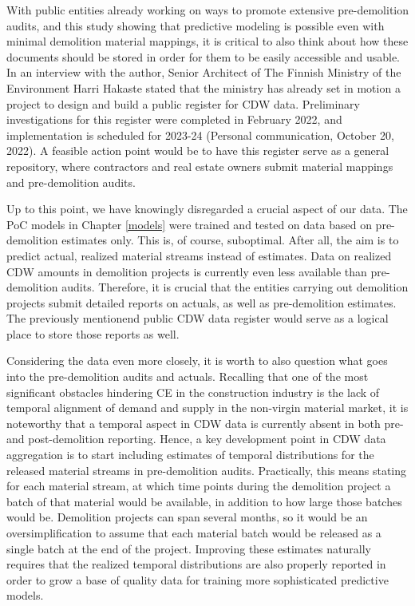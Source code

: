 \documentclass[english, 12pt, a4paper, sci, utf8, a-2b, online]{aaltothesis}
\begin{document}
With public entities already working on ways to promote extensive pre-demolition audits, and this study showing that predictive modeling is possible even with minimal demolition material mappings,
it is critical to also think about how these documents should be stored in order for them to be easily accessible and usable. In an interview with the author, Senior Architect of The Finnish
Ministry of the Environment Harri Hakaste stated that the ministry has already set in motion a
project to design and build a public register for CDW data. Preliminary investigations for this register were completed in February 2022, and implementation is scheduled for 2023-24
(Personal communication, October 20, 2022).
A feasible action point would be to have this register serve as a general repository, where contractors and real estate owners submit material mappings and pre-demolition audits.

Up to this point, we have knowingly disregarded a crucial aspect of our data. The PoC models in Chapter \ref{models} were trained and tested on data based on pre-demolition estimates
only. This is, of course, suboptimal. After all, the aim is to predict actual, realized material streams instead of estimates. Data on realized CDW amounts in demolition projects is currently
even less available than pre-demolition audits. Therefore, it is crucial that the entities carrying out demolition projects submit detailed reports on actuals, as well as pre-demolition estimates.
The previously mentionend public CDW data register would serve as a logical place to store those reports as well.

Considering the data even more closely, it is worth to also question what goes into the pre-demolition audits and actuals. Recalling that one of the most significant obstacles hindering CE in the
construction industry is the lack of temporal alignment of demand and supply in the non-virgin material market, it is noteworthy that a temporal aspect in CDW data is currently absent
in both pre- and post-demolition reporting. Hence, a key development point in CDW data aggregation is to start including estimates of temporal distributions for the released material streams in
pre-demolition audits. Practically, this means stating for each material stream, at which time points during the demolition project a batch of that material would be available, in addition to
how large those batches would be. Demolition projects can span several months, so it would be an oversimplification to assume that each material batch would be released as a single batch at
the end of the project. Improving these estimates naturally requires that the realized temporal distributions are also properly reported in order to grow a base of quality data for training more
sophisticated predictive models.
\end{document}
